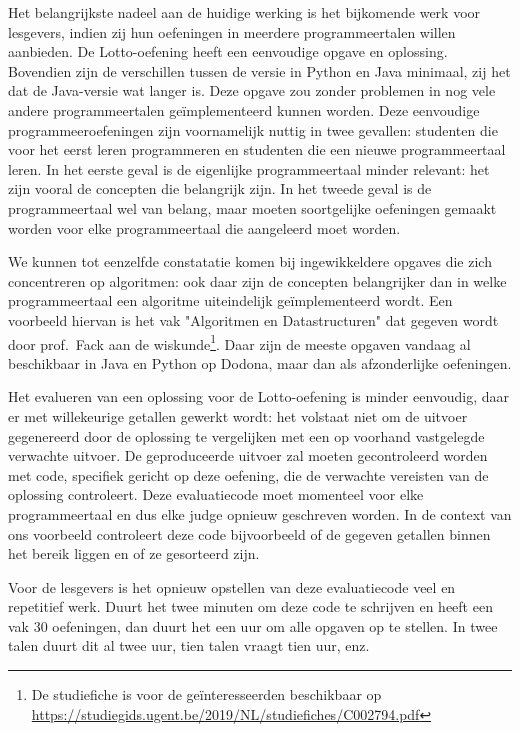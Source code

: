 Het belangrijkste nadeel aan de huidige werking is het bijkomende werk voor lesgevers, indien zij hun oefeningen in meerdere programmeertalen willen aanbieden.
De Lotto-oefening heeft een eenvoudige opgave en oplossing.
Bovendien zijn de verschillen tussen de versie in Python en Java minimaal, zij het dat de Java-versie wat langer is.
Deze opgave zou zonder problemen in nog vele andere programmeertalen geïmplementeerd kunnen worden.
Deze eenvoudige programmeeroefeningen zijn voornamelijk nuttig in twee gevallen: studenten die voor het eerst leren programmeren en studenten die een nieuwe programmeertaal leren.
In het eerste geval is de eigenlijke programmeertaal minder relevant: het zijn vooral de concepten die belangrijk zijn.
In het tweede geval is de programmeertaal wel van belang, maar moeten soortgelijke oefeningen gemaakt worden voor elke programmeertaal die aangeleerd moet worden.

We kunnen tot eenzelfde constatatie komen bij ingewikkeldere opgaves die zich concentreren op algoritmen: ook daar zijn de concepten belangrijker dan in welke programmeertaal een algoritme uiteindelijk geïmplementeerd wordt.
Een voorbeeld hiervan is het vak "Algoritmen en Datastructuren" dat gegeven wordt door prof.\ Fack aan de wiskunde\footnote{De studiefiche is voor de geïnteresseerden beschikbaar op \url{https://studiegids.ugent.be/2019/NL/studiefiches/C002794.pdf}}.
Daar zijn de meeste opgaven vandaag al beschikbaar in Java en Python op Dodona, maar dan als afzonderlijke oefeningen.

Het evalueren van een oplossing voor de Lotto-oefening is minder eenvoudig, daar er met willekeurige getallen gewerkt wordt: het volstaat niet om de uitvoer gegenereerd door de oplossing te vergelijken met een op voorhand vastgelegde verwachte uitvoer.
De geproduceerde uitvoer zal moeten gecontroleerd worden met code, specifiek gericht op deze oefening, die de verwachte vereisten van de oplossing controleert.
Deze evaluatiecode moet momenteel voor elke programmeertaal en dus elke judge opnieuw geschreven worden.
In de context van ons voorbeeld controleert deze code bijvoorbeeld of de gegeven getallen binnen het bereik liggen en of ze gesorteerd zijn.

Voor de lesgevers is het opnieuw opstellen van deze evaluatiecode veel en repetitief werk.
Duurt het twee minuten om deze code te schrijven en heeft een vak 30 oefeningen, dan duurt het een uur om alle opgaven op te stellen.
In twee talen duurt dit al twee uur, tien talen vraagt tien uur, enz.

